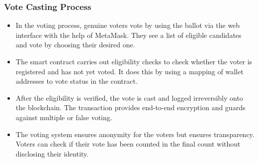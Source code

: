\documentclass[conference]{IEEEtran}
\begin{document}
\subsubsection{Vote Casting Process}
\begin{itemize}
    \item In the voting process, genuine voters vote by using the ballot via the web interface with the help of MetaMask. They see a list of eligible candidates and vote by choosing their desired one.
\item The smart contract carries out eligibility checks to check whether the voter is registered and has not yet voted. It does this by using a mapping of wallet addresses to vote status in the contract.
\item After the eligibility is verified, the vote is cast and logged irreversibly onto the blockchain. The transaction provides end-to-end encryption and guards against multiple or false voting.
\item The voting system ensures anonymity for the voters but ensures transparency. Voters can check if their vote has been counted in the final count without disclosing their identity.
\end{itemize}
\end{document}
